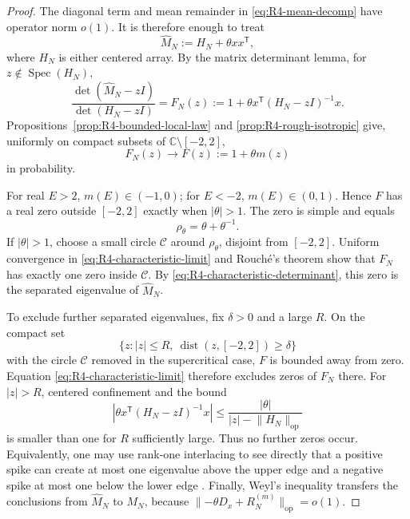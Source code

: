 \documentclass[10pt,a4paper]{amsart}
\newcommand{\spec}{\operatorname{Spec}}
\newcommand{\op}{\mathrm{op}}
\newcommand{\norm}[1]{\lVert #1\rVert}
\begin{document}
\begin{proof}
The diagonal term and mean remainder in \eqref{eq:R4-mean-decomp} have
operator norm \(o(1)\).  It is therefore enough to treat
\[
 \widehat M_N:=H_N+\theta xx^{\mathsf T},
\]
where \(H_N\) is either centered array.  By the matrix determinant lemma,
for \(z\notin\spec(H_N)\),
\begin{equation}\label{eq:R4-characteristic-determinant}
 \frac{\det(\widehat M_N-zI)}{\det(H_N-zI)}
 =F_N(z):=1+\theta x^{\mathsf T}(H_N-zI)^{-1}x.
\end{equation}
Propositions~\ref{prop:R4-bounded-local-law} and
\ref{prop:R4-rough-isotropic} give, uniformly on compact subsets of
\(\mathbb C\setminus[-2,2]\),
\begin{equation}\label{eq:R4-characteristic-limit}
 F_N(z)\longrightarrow F(z):=1+\theta m(z)
\end{equation}
in probability.

For real \(E>2\), \(m(E)\in(-1,0)\); for \(E<-2\),
\(m(E)\in(0,1)\).  Hence \(F\) has a real zero outside \([-2,2]\) exactly
when \(|\theta|>1\).  The zero is simple and equals
\[
 \rho_\theta=\theta+\theta^{-1}.
\]
If \(|\theta|>1\), choose a small circle \(\mathcal C\) around
\(\rho_\theta\), disjoint from \([-2,2]\).  Uniform convergence in
\eqref{eq:R4-characteristic-limit} and Rouch\'e's theorem show that \(F_N\)
has exactly one zero inside \(\mathcal C\).  By
\eqref{eq:R4-characteristic-determinant}, this zero is the separated
eigenvalue of \(\widehat M_N\).

To exclude further separated eigenvalues, fix \(\delta>0\) and a large
\(R\).  On the compact set
\[
 \{z:|z|\le R,\ \operatorname{dist}(z,[-2,2])\ge\delta\}
\]
with the circle \(\mathcal C\) removed in the supercritical case, \(F\) is
bounded away from zero.  Equation \eqref{eq:R4-characteristic-limit} therefore
excludes zeros of \(F_N\) there.  For \(|z|>R\), centered confinement and the
bound
\[
 \left|\theta x^{\mathsf T}(H_N-zI)^{-1}x\right|
 \le\frac{|\theta|}{|z|-\norm{H_N}_{\op}}
\]
is smaller than one for \(R\) sufficiently large.  Thus no further zeros
occur.  Equivalently, one may use rank-one interlacing to see directly that a
positive spike can create at most one eigenvalue above the upper edge and a
negative spike at most one below the lower edge
\cite{BenaychGeorgesNadakuditi2011}.  Finally, Weyl's inequality transfers the
conclusions from \(\widehat M_N\) to \(M_N\), because
\(\norm{-\theta D_x+R_N^{(m)}}_{\op}=o(1)\).
\end{proof}
\end{document}
